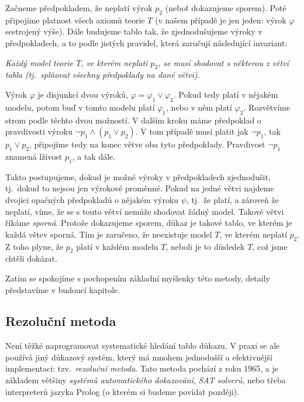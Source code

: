 Začneme předpokladem, že neplatí výrok \(p_2\) (neboť dokazujeme sporem). Poté připojíme platnost všech axiomů teorie \(T\) (v našem případě je jen jeden: výrok \( \varphi \) sestrojený výše). Dále budujeme tablo tak, že zjednodušujeme výroky v předpokladech, a to podle jistých pravidel, která zaručují následující invariant: 

\begin{tcolorbox}
\emph{Každý model teorie \(T\), ve kterém neplatí \(p_2\), se musí \emph{shodovat} s některou z větví tabla (tj.\ splňovat všechny předpoklady na dané větvi).} 
\end{tcolorbox}

Výrok \( \varphi \) je disjunkcí dvou výroků, \( \varphi = \varphi_1 \lor \varphi_2 \). Pokud tedy platí v nějakém modelu, potom buď v tomto modelu platí \( \varphi_1 \), nebo v něm platí \( \varphi_2 \). Rozvětvíme strom podle těchto dvou možností. V dalším kroku máme předpoklad o pravdivosti výroku \( \neg p_1 \land (p_1 \lor p_2) \). V tom případě musí platit jak \( \neg p_1 \), tak \( p_1 \lor p_2 \), připojíme tedy na konec větve oba tyto předpoklady. Pravdivost \( \neg p_1 \) znamená lživost \( p_1 \), a tak dále.

Takto postupujeme, dokud je možné výroky v předpokladech zjednodušit, tj.\ dokud to nejsou jen výrokové proměnné. Pokud na jedné větvi najdeme dvojici opačných předpokladů o nějakém výroku \( \psi \), tj.\ že platí, a zároveň že neplatí, víme, že se s touto větví nemůže shodovat žádný model. Takové větvi říkáme \emph{sporná}.  Protože dokazujeme sporem, důkaz je takové tablo, ve kterém je každá větev sporná. Tím je zaručeno, že neexistuje model \(T\), ve kterém neplatí \(p_2\). Z toho plyne, že \(p_2\) platí v každém modelu \(T\), neboli je to důsledek \(T\), což jsme chtěli dokázat.

Zatím se spokojíme s pochopením základní myšlenky této metody, detaily představíme v budoucí kapitole.
 
\subsection{Rezoluční metoda}

Není těžké naprogramovat systematické hledání tablo důkazu. V praxi se ale používá jiný důkazový systém, který má mnohem jednodušší a efektivnější implementaci: tzv.\ \emph{rezoluční metoda}. Tato metoda pochází z roku 1965, a je základem většiny \emph{systémů automatického dokazování}, \emph{SAT solverů}, nebo třeba interpreterů jazyka Prolog (o kterém si budeme povídat později).

